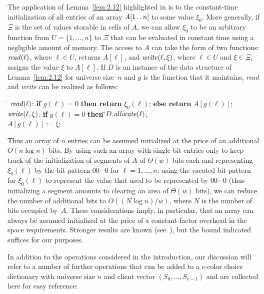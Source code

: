 \documentclass[envcountsame,envcountsect,undated,nolinenumbers]{lnthi}
\def\Tvn#1{\hbox{\textit{#1\/}}}
\def\Ttwodots{\mathinner{\ldotp\ldotp}}\def\Tsup#1{^{\mbox{\scriptsize #1}}}\gdef\Tsub#1{_{\mbox{\scriptsize #1}}}\def\cchoice{\overline{\Tvn{choice}}}
\begin{document}
The application of
Lemma~\ref{lem:2.12}
highlighted in \cite[Exercise 2.12]{AhoHU74}
is to the constant-time initialization of all
entries of an array $A[1\Ttwodots n]$ to some
value $\xi_0$.
More generally,
if $\Xi$ is the set of values storable in cells of $A$,
we can allow $\xi_0$ to be an
arbitrary function from $U=\{1,\ldots,n\}$ to $\Xi$
that can be evaluated in constant time using
a negligible amount of memory.
The access to $A$ can take the form of two functions:
$\Tvn{read}(\ell)$, where $\ell\in U$, returns $A[\ell]$,
and $\Tvn{write}(\ell,\xi)$, where $\ell\in U$ and $\xi\in \Xi$,
assigns the value $\xi$ to $A[\ell]$.
If $D$ is an instance of the data structure of
Lemma~\ref{lem:2.12} for universe size~$n$
and $g$ is the function that it maintains,
\Tvn{read} and \Tvn{write} can be realized as follows:

\begin{tabbing}
\quad\=\hskip 3cm\=\kill
\>$\Tvn{read}(\ell)$:
\>\textbf{if} $g(\ell)=0$ \textbf{then return} $\xi_0(\ell)$;
\textbf{else return} $A[g(\ell)]$;\\
\>$\Tvn{write}(\ell,\xi)$:
\>\textbf{if} $g(\ell)=0$ \textbf{then} \=$D.\Tvn{allocate}(\ell)$;\\
\>\>$A[g(\ell)]:=\xi$;
\end{tabbing}

Thus an array of $n$ entries can be assumed initialized
at the price of an additional $O(n\log n)$ bits.
By using such an array with single-bit entries
only to keep track of the
initialization of segments of $A$ of $\Theta(w)$ bits each and
representing $\xi_0(\ell)$ by the bit pattern $00\cdots 0$
for $\ell=1,\ldots,n$, using the vacated bit pattern
for $\xi_0(\ell)$ to represent the value that used
to be represented by $00\cdots 0$ (thus initializing
a segment amounts to clearing an area of
$\Theta(w)$ bits), we can reduce the number
of additional bits to $O({{(N\log n)}/w})$,
where $N$ is the number of bits
occupied by~$A$.
These considerations imply, in particular,
that an array can always
be assumed initialized at the price of a constant-factor
overhead in the space requirements.
Stronger results are known (see~\cite{FreK16}),
but the bound indicated
suffices for our purposes.


In addition to the operations considered in the
introduction, our discussion will refer to
a number of further operations that can be
added to a $c$-color choice dictionary with
universe size $n$ and client vector $(S_0,\ldots,S_{c-1})$
and are collected here for easy reference:
\end{document}
